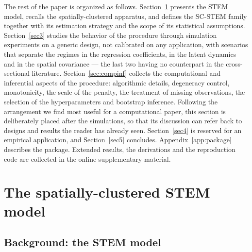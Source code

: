 The rest of the paper is organized as follows. Section~\ref{sec2} presents the STEM model, recalls the spatially-clustered apparatus, and defines the SC-STEM family together with its estimation strategy and the scope of its statistical assumptions. Section~\ref{sec3} studies the behavior of the procedure through simulation experiments on a generic design, not calibrated on any application, with scenarios that separate the regimes in the regression coefficients, in the latent dynamics and in the spatial covariance --- the last two having no counterpart in the cross-sectional literature. Section~\ref{sec:compinf} collects the computational and inferential aspects of the procedure: algorithmic details, degeneracy control, monotonicity, the scale of the penalty, the treatment of missing observations, the selection of the hyperparameters and bootstrap inference. Following the arrangement we find most useful for a computational paper, this section is deliberately placed after the simulations, so that its discussion can refer back to designs and results the reader has already seen. Section~\ref{sec4} is reserved for an empirical application, and Section~\ref{sec5} concludes. Appendix~\ref{app:package} describes the \Stem{} package. Extended results, the derivations and the reproduction code are collected in the online supplementary material.

\section{The spatially-clustered STEM model}\label{sec2}

\subsection{Background: the STEM model}\label{sec2:stem}

